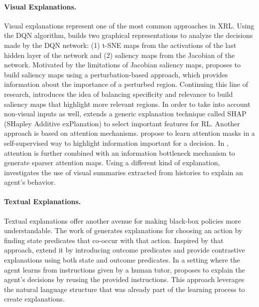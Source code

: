 \paragraph{Visual Explanations.}
Visual explanations represent one of the most common approaches in XRL. Using the DQN algorithm, \cite{zahavy_graying_2016} builds two graphical representations to analyze the decisions made by the DQN network: (1) t-SNE maps \cite{maaten_visualizing_2008} from the activations of the last hidden layer of the network and (2) saliency maps from the Jacobian of the network. 
Motivated by the limitations of Jacobian saliency maps, \cite{greydanus_visualizing_2018} proposes to build saliency maps using a perturbation-based approach, which provides information about the importance of a perturbed region. Continuing this line of research, \cite{gupta_explain_2020} introduces the idea of balancing specificity and relevance to build saliency maps that highlight more relevant regions.
In order to take into account non-visual inputs as well, \cite{wang_attribution-based_2020} extends a generic explanation technique called SHAP (SHapley Additive exPlanation) \cite{lundberg_unified_2017} to select important features for RL.
Another approach is based on attention mechanisms. \cite{shi_self-supervised_2020} propose to learn attention masks in a self-supervised way to highlight information important for a decision. In \cite{kim_attentional_2020}, attention is further combined with an information bottleneck mechanism to generate sparser attention maps. Using a different kind of explanation, \cite{sequeira_interestingness_2020} investigates the use of visual summaries extracted from histories to explain an agent's behavior.

\paragraph{Textual Explanations.}
Textual explanations offer another avenue for making black-box policies more understandable. The work of \cite{hayes_improving_2017} generates explanations for choosing an action by finding state predicates that co-occur with that action. Inspired by that approach, \cite{van_der_waa_contrastive_2018} extend it by introducing outcome predicates and provide contrastive explanations using both state and outcome predicates.
In a setting where the agent learns from instructions given by a human tutor, \cite{fukuchi_autonomous_2017} proposes to explain the agent's decisions by reusing the provided instructions. This approach leverages the natural language structure that was already part of the learning process to create explanations.

